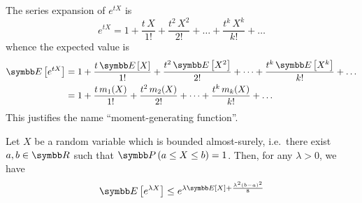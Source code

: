 \begin{remark*}
The series expansion of \(e^{t X}\) is
\[
    e^{t X} = 1 + \frac{t \, X}{1!} + \frac{t^2 \, X^2}{2!} + \dots + \frac{t^k \, X^k}{k!} + \dots
\]
whence the expected value is
\begin{align*}
    \expectedvalue\left[e^{t X}\right] &= 1 + \frac{t \, \expectedvalue\left[X\right]}{1!} + \frac{t^2 \, \expectedvalue\left[X^2\right]}{2!} + \dots + \frac{t^k \, \expectedvalue\left[X^k\right]}{k!} + \dots \\
    &= 1 + \frac{t \, m_1 (X)}{1!} + \frac{t^2 \, m_2 (X)}{2!} + \dots + \frac{t^k \, m_k (X)}{k!} + \dots
\end{align*}
This justifies the name ``moment-generating function''.
\end{remark*}

\begin{lemma*}
Let \(X\) be a random variable which is bounded almost-surely, i.e.\ there exist \(a, b \in \reals\) such that \(\probability\left(a \leq X \leq b\right) = 1\). Then, for any \(\lambda > 0\), we have
\[
    \expectedvalue\left[e^{\lambda X}\right] \leq e^{\lambda \expectedvalue[X] + \frac{\lambda^2 (b - a)^2}{8}}
\]
\end{lemma*}
